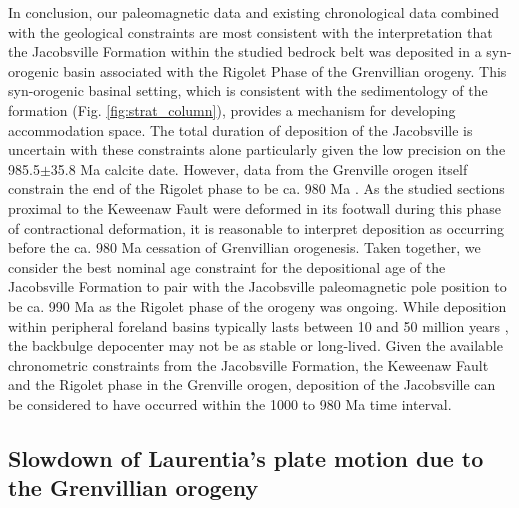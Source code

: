 \documentclass[draft]{agujournal2019}
\begin{document}
In conclusion, our paleomagnetic data and existing chronological data combined with the geological constraints are most consistent with the interpretation that the Jacobsville Formation within the studied bedrock belt was deposited in a syn-orogenic basin associated with the Rigolet Phase of the Grenvillian orogeny. This syn-orogenic basinal setting, which is consistent with the sedimentology of the formation (Fig. \ref{fig:strat_column}), provides a mechanism for developing accommodation space. The total duration of deposition of the Jacobsville is uncertain with these constraints alone particularly given the low precision on the 985.5$\pm$35.8 Ma calcite date. However, data from the Grenville orogen itself constrain the end of the Rigolet phase to be ca. 980 Ma \cite{Swanson-Hysell2023a}. As the studied sections proximal to the Keweenaw Fault were deformed in its footwall during this phase of contractional deformation, it is reasonable to interpret deposition as occurring before the ca. 980 Ma cessation of Grenvillian orogenesis. Taken together, we consider the best nominal age constraint for the depositional age of the Jacobsville Formation to pair with the Jacobsville paleomagnetic pole position to be ca. 990 Ma as the Rigolet phase of the orogeny was ongoing. While deposition within peripheral foreland basins typically lasts between 10 and 50 million years \cite{Woodcock2004a}, the backbulge depocenter may not be as stable or long-lived. Given the available chronometric constraints from the Jacobsville Formation, the Keweenaw Fault and the Rigolet phase in the Grenville orogen, deposition of the Jacobsville can be considered to have occurred within the 1000 to 980 Ma time interval.

\subsection*{Slowdown of Laurentia's plate motion due to the Grenvillian orogeny}
\end{document}
